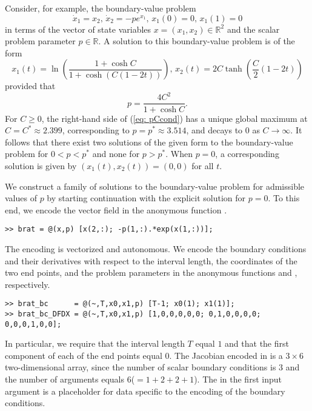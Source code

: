 Consider, for example, the boundary-value problem
\begin{equation}
\dot{x}_1=x_2,\,\dot{x}_2=-pe^{x_1},\,x_1(0)=0,\,x_1(1)=0
\end{equation}
in terms of the vector of state variables $x=(x_1,x_2)\in\mathbb{R}^2$ and the scalar problem parameter $p\in\mathbb{R}$. A solution to this boundary-value problem is of the form
\begin{equation}
x_1(t)=\ln\left(\frac{1+\cosh C}{1+\cosh\left(C(1-2t)\right)}\right),\,x_2(t)=2C\tanh\left(\frac{C}{2}(1-2t)\right)
\end{equation}
provided that
\begin{equation}
p=\frac{4C^2}{1+\cosh C}.
\label{eq: pCcond}
\end{equation}
For $C\ge 0$, the right-hand side of (\ref{eq: pCcond}) has a unique global maximum at $C=C^\ast\approx 2.399$, corresponding to $p=p^\ast\approx3.514$, and decays to $0$ as $C\rightarrow\infty$. It follows that there exist two solutions of the given form to the boundary-value problem for $0<p<p^\ast$ and none for $p>p^\ast$. When $p=0$, a corresponding solution is given by $(x_1(t),x_2(t))=(0,0)$ for all $t$.

We construct a family of solutions to the boundary-value problem for admissible values of $p$ by starting continuation with the explicit solution for $p=0$. To this end, we encode the vector field in the anonymous function .
\begin{lstlisting}[language=coco-highlight]
>> brat = @(x,p) [x(2,:); -p(1,:).*exp(x(1,:))];
\end{lstlisting}
The encoding is vectorized and autonomous. We encode the boundary conditions and their derivatives with respect to the interval length, the coordinates of the two end points, and the problem parameters in the anonymous functions  and , respectively.
\begin{lstlisting}[language=coco-highlight]
>> brat_bc      = @(~,T,x0,x1,p) [T-1; x0(1); x1(1)];
>> brat_bc_DFDX = @(~,T,x0,x1,p) [1,0,0,0,0,0; 0,1,0,0,0,0; 0,0,0,1,0,0];
\end{lstlisting}
In particular, we require that the interval length $T$ equal $1$ and that the first component of each of the end points equal $0$. The Jacobian encoded in  is a $3\times 6$ two-dimensional array, since the number of scalar boundary conditions is $3$ and the number of arguments equals $6$($=1+2+2+1$). The \mcode{\~} in the first input argument is a placeholder for data specific to the encoding of the boundary conditions.

